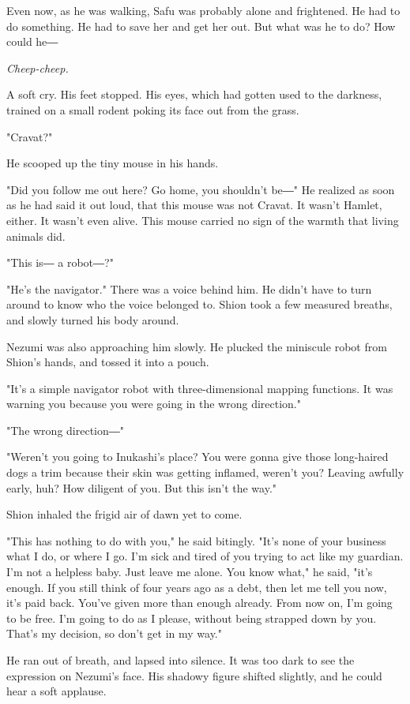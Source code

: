 Even now, as he was walking, Safu was probably alone and frightened. He
had to do something. He had to save her and get her out. But what was he
to do? How could he―

\emph{Cheep-cheep.}

A soft cry. His feet stopped. His eyes, which had gotten used to the
darkness, trained on a small rodent poking its face out from the grass.

"Cravat?"

He scooped up the tiny mouse in his hands.

"Did you follow me out here? Go home, you shouldn't be―" He realized as
soon as he had said it out loud, that this mouse was not Cravat. It
wasn't Hamlet, either. It wasn't even alive. This mouse carried no sign
of the warmth that living animals did.

"This is― a robot―?"

"He's the navigator." There was a voice behind him. He didn't have to
turn around to know who the voice belonged to. Shion took a few measured
breaths, and slowly turned his body around.

Nezumi was also approaching him slowly. He plucked the miniscule robot
from Shion's hands, and tossed it into a pouch.

"It's a simple navigator robot with three-dimensional mapping functions.
It was warning you because you were going in the wrong direction."

"The wrong direction―"

"Weren't you going to Inukashi's place? You were gonna give those
long-haired dogs a trim because their skin was getting inflamed, weren't
you? Leaving awfully early, huh? How diligent of you. But this isn't the
way."

Shion inhaled the frigid air of dawn yet to come.

"This has nothing to do with you," he said bitingly. "It's none of your
business what I do, or where I go. I'm sick and tired of you trying to
act like my guardian. I'm not a helpless baby. Just leave me alone. You
know what," he said, "it's enough. If you still think of four years ago
as a debt, then let me tell you now, it's paid back. You've given more
than enough already. From now on, I'm going to be free. I'm going to do
as I please, without being strapped down by you. That's my decision, so
don't get in my way."

He ran out of breath, and lapsed into silence. It was too dark to see
the expression on Nezumi's face. His shadowy figure shifted slightly,
and he could hear a soft applause.

